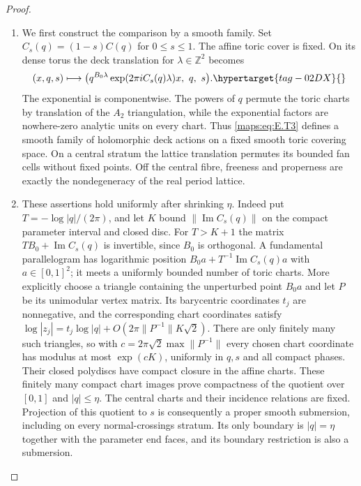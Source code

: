 \documentclass[11pt,a4paper]{article}
\numberwithin{equation}{section}
\theoremstyle{definition}
\begin{document}
\begin{proof}
\begin{enumerate}[label=\arabic*.,leftmargin=*]
\item We first construct the comparison by a smooth family.  Set
$C_s(q)=(1-s)C(q)$ for $0\leq s\leq1$.  The affine toric cover
is fixed.  On its dense torus the deck translation for
$\lambda\in\mathbb Z^2$ becomes
\begin{equation}
 (x,q,s)\longmapsto
 \bigl(q^{B_0\lambda}
       \exp(2\pi i C_s(q)\lambda)x,\ q,\ s\bigr).
 \hypertarget{tag-02DX}{}\label{maps:eq:E.T3}
\end{equation}
The exponential is componentwise.  The powers of $q$ permute
the toric charts by translation of the $A_2$ triangulation,
while the exponential factors are nowhere-zero analytic units
on every chart.  Thus \eqref{maps:eq:E.T3} defines a smooth family of
holomorphic deck actions on a fixed smooth toric covering
space.  On a central stratum the lattice translation permutes
its bounded fan cells without fixed points.  Off the central
fibre, freeness and properness are exactly the nondegeneracy
of the real period lattice.

\item These assertions hold uniformly after shrinking $\eta$.
Indeed put $T=-\log|q|/(2\pi)$, and let $K$ bound
$\|\operatorname{Im}C_s(q)\|$ on the compact parameter interval
and closed disc.  For $T>K+1$ the matrix
$TB_0+\operatorname{Im}C_s(q)$ is invertible, since $B_0$ is
orthogonal.  A fundamental parallelogram has logarithmic
position
$B_0a+T^{-1}\operatorname{Im}C_s(q)a$ with
$a\in[0,1]^2$; it meets a uniformly bounded number of toric
charts.  More explicitly choose a triangle containing the
unperturbed point $B_0a$ and let $P$ be its unimodular vertex
matrix.  Its barycentric coordinates $t_j$ are nonnegative,
and the corresponding chart coordinates satisfy
$\log|z_j|=t_j\log|q|+
O(2\pi\|P^{-1}\|K\sqrt2)$.
There are only finitely many such triangles, so with
$c=2\pi\sqrt2\max\|P^{-1}\|$ every chosen chart coordinate
has modulus at most $\exp(cK)$, uniformly in $q,s$ and
all compact phases.  Their closed polydiscs have compact
closure in the affine charts.  These finitely many compact
chart images prove
compactness of the quotient over $[0,1]$ and $|q|\leq\eta$.
The central charts and their incidence relations are fixed.
Projection of this quotient to $s$ is consequently a proper
smooth submersion, including on every normal-crossings stratum.
Its only boundary is $|q|=\eta$ together with the parameter
end faces, and its boundary restriction is also a submersion.


\end{enumerate}
\end{proof}
\end{document}
